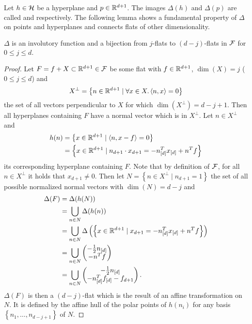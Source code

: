 Let $h \in \mathcal{H}$ be a hyperplane and $p \in \mathbb{R}^{d+1}$. The images $\Delta(h)$ and $\Delta(p)$ are called  and  respectively.
The following lemma shows a fundamental property of $\Delta$ on points and hyperplanes and connects flats of other dimensionality.
\begin{lemma}
    \label{lem:deltainvolutory}
    $\Delta$ is an involutory function and a bijection from $j$-flats to $(d-j)$-flats in $\mathcal{F}$ for $0 \leq j \leq d$.
\end{lemma}
\begin{proof}
    Let $F = f + X \subset \mathbb{R}^{d+1} \in \mathcal{F}$ be some flat with $f \in \mathbb{R}^{d+1}$, $\dim(X) = j$ ($0 \leq j \leq d$) and
    \begin{align}
        X^\bot = \left\{ n \in \mathbb{R}^{d+1} \mid \forall x \in X. \left\langle n, x \right\rangle = 0 \right\}
    \end{align}
    the set of all vectors perpendicular to $X$ for which $\dim(X^\bot) = d - j + 1$.
    Then all hyperplanes containing $F$ have a normal vector which is in $X^\bot$.
    Let $n \in X^\bot$ and
    \begin{align}
        h(n) &= \left\{x \in \mathbb{R}^{d+1} \mid \left\langle n, x - f \right\rangle = 0\right\}\\
        &= \left\{ x \in \mathbb{R}^{d+1} \mid n_{d+1} \cdot x_{d+1} = -n_{[d]}^Tx_{[d]} + n^Tf \right\}
    \end{align}
    its corresponding hyperplane containing $F$.
    Note that by definition of $\mathcal{F}$, for all $n \in X^\bot$ it holds that $x_{d+1} \neq 0$.
    Then let $N = \left\{ n \in X^\bot \mid n_{d+1} = 1 \right\}$ the set of all possible normalized normal vectors with $\dim(N) = d - j$ and
    \begin{align}
        \Delta(F) &= \Delta(h(N))\\
        &= \bigcup_{n \in N} \Delta(h(n)) \\
        &= \bigcup_{n \in N} \Delta \left( \left\{ x \in \mathbb{R}^{d+1} \mid x_{d+1} = -n_{[d]}^Tx_{[d]} + n^Tf \right\} \right) \\
        &= \bigcup_{n \in N} \begin{pmatrix} -\frac{1}{2} n_{[d]}\\ - n^T f \end{pmatrix} \\
        &= \bigcup_{n \in N} \begin{pmatrix} -\frac{1}{2} n_{[d]}\\ - n_{[d]}^T f_{[d]} - f_{d+1} \end{pmatrix}.
    \end{align}
    $\Delta(F)$ is then a $(d - j)$-flat which is the result of an affine transformation on $N$.
    It is defined by the affine hull of the polar points of $h(n_i)$ for any basis $\left\{ n_1, \dots, n_{d - j + 1} \right\}$ of $N$.


\end{proof}
